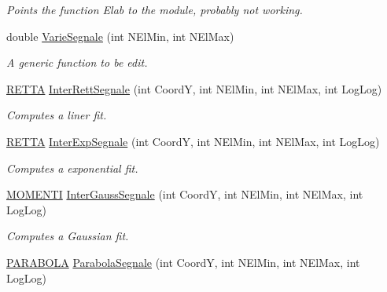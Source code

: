 \begin{DoxyCompactItemize}
\begin{DoxyCompactList}\small\item\em \-Points the function \-Elab to the module, probably not working. \end{DoxyCompactList}\item 
\hypertarget{classVarDatFile_aa8c3dec822e735ee8835f0e19d8b15a3}{double \hyperlink{classVarDatFile_aa8c3dec822e735ee8835f0e19d8b15a3}{\-Varie\-Segnale} (int \-N\-El\-Min, int \-N\-El\-Max)}\label{classVarDatFile_aa8c3dec822e735ee8835f0e19d8b15a3}

\begin{DoxyCompactList}\small\item\em \-A generic function to be edit. \end{DoxyCompactList}\item 
\hypertarget{classVarDatFile_ad705e28f47a98707e3dd3c83d86e85b3}{\hyperlink{structRETTA}{\-R\-E\-T\-T\-A} \hyperlink{classVarDatFile_ad705e28f47a98707e3dd3c83d86e85b3}{\-Inter\-Rett\-Segnale} (int \-Coord\-Y, int \-N\-El\-Min, int \-N\-El\-Max, int \-Log\-Log)}\label{classVarDatFile_ad705e28f47a98707e3dd3c83d86e85b3}

\begin{DoxyCompactList}\small\item\em \-Computes a liner fit. \end{DoxyCompactList}\item 
\hypertarget{classVarDatFile_a7e8033bdeb05d587eb6ce7dedf3ffe8b}{\hyperlink{structRETTA}{\-R\-E\-T\-T\-A} \hyperlink{classVarDatFile_a7e8033bdeb05d587eb6ce7dedf3ffe8b}{\-Inter\-Exp\-Segnale} (int \-Coord\-Y, int \-N\-El\-Min, int \-N\-El\-Max, int \-Log\-Log)}\label{classVarDatFile_a7e8033bdeb05d587eb6ce7dedf3ffe8b}

\begin{DoxyCompactList}\small\item\em \-Computes a exponential fit. \end{DoxyCompactList}\item 
\hypertarget{classVarDatFile_a77d32f56ea66cb8070e708766c7577ea}{\hyperlink{structMOMENTI}{\-M\-O\-M\-E\-N\-T\-I} \hyperlink{classVarDatFile_a77d32f56ea66cb8070e708766c7577ea}{\-Inter\-Gauss\-Segnale} (int \-Coord\-Y, int \-N\-El\-Min, int \-N\-El\-Max, int \-Log\-Log)}\label{classVarDatFile_a77d32f56ea66cb8070e708766c7577ea}

\begin{DoxyCompactList}\small\item\em \-Computes a \-Gaussian fit. \end{DoxyCompactList}\item 
\hypertarget{classVarDatFile_a670b0120b56b71deeb92a07dbc2d1a93}{\hyperlink{structPARABOLA}{\-P\-A\-R\-A\-B\-O\-L\-A} \hyperlink{classVarDatFile_a670b0120b56b71deeb92a07dbc2d1a93}{\-Parabola\-Segnale} (int \-Coord\-Y, int \-N\-El\-Min, int \-N\-El\-Max, int \-Log\-Log)}\label{classVarDatFile_a670b0120b56b71deeb92a07dbc2d1a93}


\end{DoxyCompactItemize}
